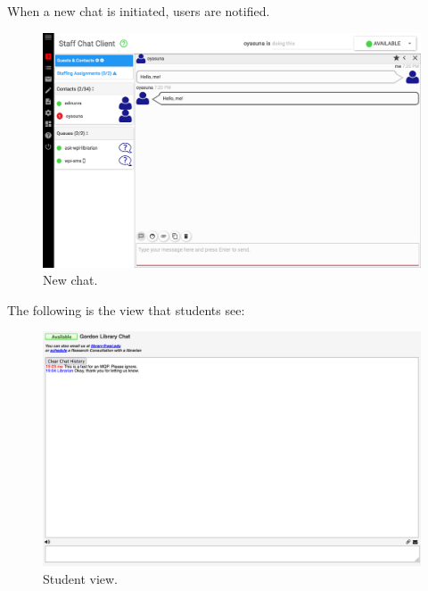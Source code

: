 When a new chat is initiated, users are notified.

\begin{figure}[H]
    \centering
    \includegraphics[width=\textwidth]{assets/img/libraryh3lp/me.png}
    \caption{New chat.}
\end{figure}

The following is the view that students see:

\begin{figure}[H]
    \centering
    \includegraphics[width=\textwidth]{assets/img/libraryh3lp/libraryh3lp_student_view.png}
    \caption{Student view.}
\end{figure}
